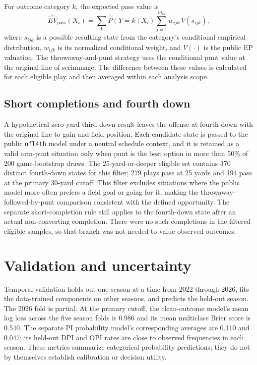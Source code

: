 \documentclass[11pt]{article}
\begin{document}
For outcome category $k$, the expected pass value is
\begin{equation}
  \widehat{EV}_{\mathrm{pass}}(X_i)
  = \sum_k \widehat{P}(Y=k\mid X_i)
    \sum_{j=1}^{m_{ik}} w_{ijk}\,V(s_{ijk}),
\end{equation}
where $s_{ijk}$ is a possible resulting state from the category's conditional empirical distribution, $w_{ijk}$ is its normalized conditional weight, and $V(\cdot)$ is the public EP valuation. The throwaway-and-punt strategy uses the conditional punt value at the original line of scrimmage. The difference between these values is calculated for each eligible play and then averaged within each analysis scope.

\subsection{Short completions and fourth down}

A hypothetical zero-yard third-down result leaves the offense at fourth down with the original line to gain and field position. Each candidate state is passed to the public \texttt{nfl4th} model under a neutral schedule context, and it is retained as a valid arm-punt situation only when punt is the best option in more than 50\% of 200 game-bootstrap draws. The 25-yard-or-deeper eligible set contains 370 distinct fourth-down states for this filter; 279 plays pass at 25 yards and 194 pass at the primary 30-yard cutoff. This filter excludes situations where the public model more often prefers a field goal or going for it, making the throwaway-followed-by-punt comparison consistent with the defined opportunity. The separate short-completion rule still applies to the fourth-down state after an actual non-converting completion. There were no such completions in the filtered eligible samples, so that branch was not needed to value observed outcomes.

\section{Validation and uncertainty}

Temporal validation holds out one season at a time from 2022 through 2026, fits the data-trained components on other seasons, and predicts the held-out season. The 2026 fold is partial. At the primary cutoff, the clean-outcome model's mean log loss across the five season folds is 0.986 and its mean multiclass Brier score is 0.540. The separate PI probability model's corresponding averages are 0.110 and 0.047; its held-out DPI and OPI rates are close to observed frequencies in each season. These metrics summarize categorical probability predictions; they do not by themselves establish calibration or decision utility.
\end{document}
